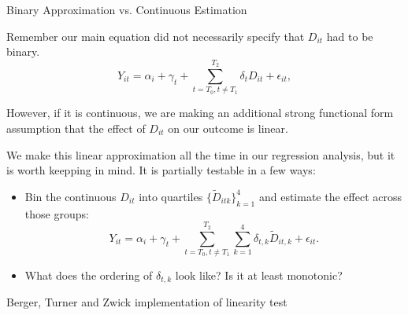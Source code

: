 \documentclass[notes,11pt, aspectratio=169]{beamer}
\newenvironment{wideitemize}{\itemize\addtolength{\itemsep}{10pt}}{\enditemize}
\begin{document}
\begin{frame}{Binary Approximation vs. Continuous Estimation}
  \begin{wideitemize}
    \item Remember our main equation did not necessarily specify that $D_{it}$ had to be binary. 
      \begin{equation}
      Y_{it} = \alpha_{i} + \gamma_{t} + \sum_{t=T_{0}, t\not=T_{1}}^{T_{2}}\delta_{t} D_{it} + \epsilon_{it},
    \end{equation}
  \item However, if it is continuous, we are making an additional
    strong functional form assumption that the effect of $D_{it}$ on our
    outcome is linear.
  \item We make this linear approximation all the time in our
    regression analysis, but it is worth keepping in mind. It is
    partially testable in a few ways:
    \begin{itemize}
    \item Bin the continuous $D_{it}$ into quartiles $\{\widetilde{D}_{itk}\}_{k=1}^{4}$ and estimate the effect across those groups:
      \begin{equation}
        Y_{it} = \alpha_{i} + \gamma_{t} + \sum_{t=T_{0}, t\not=T_{1}}^{T_{2}}\sum_{k=1}^{4}\delta_{t,k} \widetilde{D}_{it,k} + \epsilon_{it}.
      \end{equation}
    \item What does the ordering of $\delta_{t,k}$ look like? Is it at least monotonic?
    \end{itemize}
  \end{wideitemize}
\end{frame}

\begin{frame}{Berger, Turner and Zwick implementation of linearity test}
\end{frame}
\end{document}
